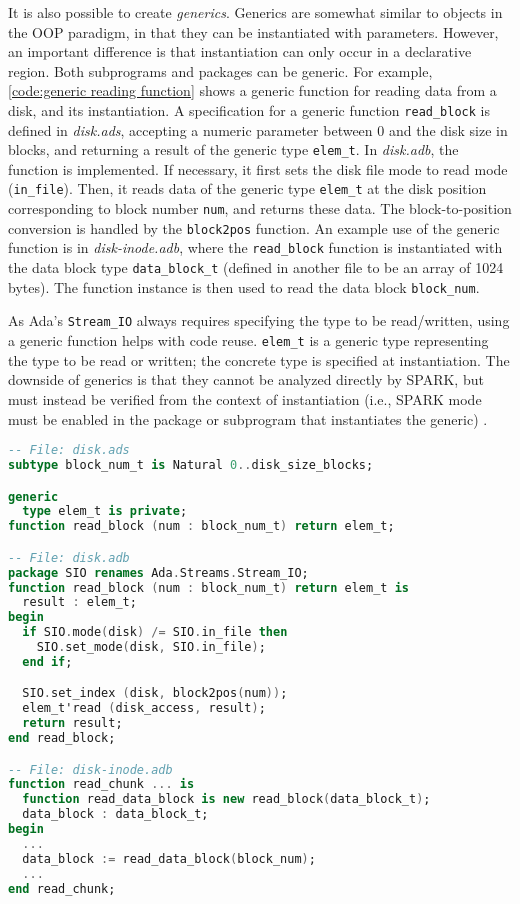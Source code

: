 It is also possible to create \textit{generics}.
Generics are somewhat similar to objects in the OOP paradigm, in that they can be instantiated with parameters.
However, an important difference is that instantiation can only occur in a declarative region.
Both subprograms and packages can be generic.
For example, \autoref{code:generic reading function} shows a generic function for reading data from a disk, and its instantiation.
A specification for a generic function \lstinline[language=Ada]{read_block} is defined in \textit{disk.ads}, accepting a numeric parameter between 0 and the disk size in blocks, and returning a result of the generic type \lstinline[language=Ada]{elem_t}.
In \textit{disk.adb}, the function is implemented.
If necessary, it first sets the disk file mode to read mode (\lstinline[language=Ada]{in_file}).
Then, it reads data of the generic type \lstinline[language=Ada]{elem_t} at the disk position corresponding to block number \lstinline[language=Ada]{num}, and returns these data.
The block-to-position conversion is handled by the \lstinline[language=Ada]{block2pos} function.
An example use of the generic function is in \textit{disk-inode.adb}, where the \lstinline[language=Ada]{read_block} function is instantiated with the data block type \lstinline[language=Ada]{data_block_t} (defined in another file to be an array of 1024 bytes).
The function instance is then used to read the data block \lstinline[language=Ada]{block_num}.

As Ada's \lstinline[language=Ada]{Stream_IO} always requires specifying the type to be read/written, using a generic function helps with code reuse.
\lstinline[language=Ada]{elem_t} is a generic type representing the type to be read or written; the concrete type is specified at instantiation.
The downside of generics is that they cannot be analyzed directly by SPARK, but must instead be verified from the context of instantiation (i.e., SPARK mode must be enabled in the package or subprogram that instantiates the generic) \cite{sparkRM}.

\begin{lstlisting}[float=tb,caption={Generic function for reading a block of type \textnormal{elem\_t}}, label={code:generic reading function}, language=Ada]
-- File: disk.ads
subtype block_num_t is Natural 0..disk_size_blocks;

generic
  type elem_t is private;
function read_block (num : block_num_t) return elem_t;

-- File: disk.adb
package SIO renames Ada.Streams.Stream_IO;
function read_block (num : block_num_t) return elem_t is
  result : elem_t;
begin
  if SIO.mode(disk) /= SIO.in_file then
    SIO.set_mode(disk, SIO.in_file);
  end if;

  SIO.set_index (disk, block2pos(num));
  elem_t'read (disk_access, result);
  return result;
end read_block;

-- File: disk-inode.adb
function read_chunk ... is
  function read_data_block is new read_block(data_block_t);
  data_block : data_block_t;
begin
  ...
  data_block := read_data_block(block_num);
  ...
end read_chunk;
\end{lstlisting}

